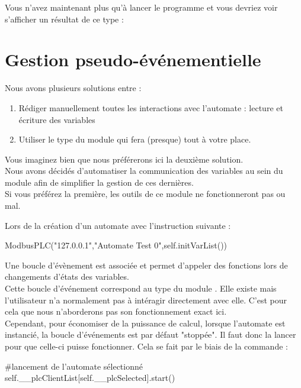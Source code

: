 Vous n'avez maintenant plus qu'à lancer le programme
et vous devriez voir s'afficher un résultat de ce type :




\section{Gestion pseudo-événementielle}

Nous avons plusieurs solutions entre : 
\begin{enumerate}
\item Rédiger manuellement toutes les interactions avec l'automate : lecture et écriture des variables
\item Utiliser le type  du module  qui fera (presque) tout à votre place.
\end{enumerate}
Vous imaginez bien que nous préférerons ici la deuxième solution.\\
Nous avons décidés d'automatiser la communication des variables au sein du module 
 afin de simplifier la gestion de ces dernières. \\
Si vous préférez la première, les outils de ce module ne fonctionneront pas ou mal.\smallSkip

Lors de la création d'un automate avec l'instruction suivante :
\begin{pyCode}
ModbusPLC("127.0.0.1","Automate Test 0",self.initVarList())
\end{pyCode}
Une boucle d'évènement est associée et permet d'appeler des fonctions lors de changements d'états des variables. \\
Cette boucle d'événement correspond au type  du module . Elle existe mais l'utilisateur n'a normalement pas à intéragir directement avec elle. C'est pour cela que nous n'aborderons pas son fonctionnement exact ici.\\

Cependant, pour économiser de la puissance de calcul, lorsque l'automate est instancié, la boucle d'événements est par défaut "stoppée". Il faut donc la lancer pour que celle-ci puisse fonctionner. Cela se fait par le biais de la commande :
\begin{pyCode}
	#lancement de l'automate sélectionné
	self.__plcClientList[self.__plcSelected].start()
\end{pyCode}

